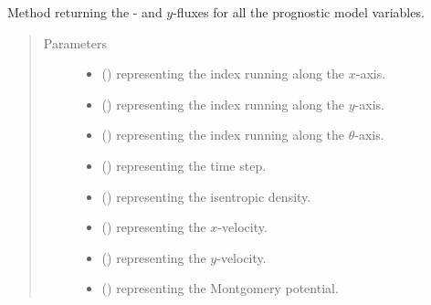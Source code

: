\documentclass[letterpaper,10pt,english]{sphinxmanual}
\begin{document}
\begin{fulllineitems}
\begin{fulllineitems}
\label{\detokenize{api:dycore.flux_isentropic_nonconservative.FluxIsentropicNonconservative.get_horizontal_fluxes}}
Method returning the - and \(y\)-fluxes
for all the prognostic model variables.
\begin{quote}\begin{description}
\item[{Parameters}] \leavevmode\begin{itemize}
\item {} 
 () \textendash{}  representing the index running along the \(x\)-axis.

\item {} 
 () \textendash{}  representing the index running along the \(y\)-axis.

\item {} 
 () \textendash{}  representing the index running along the \(\theta\)-axis.

\item {} 
 () \textendash{}  representing the time step.

\item {} 
 () \textendash{}  representing the isentropic density.

\item {} 
 () \textendash{}  representing the \(x\)-velocity.

\item {} 
 () \textendash{}  representing the \(y\)-velocity.

\item {} 
 () \textendash{}  representing the Montgomery potential.


\end{itemize}
\end{description}
\end{quote}
\end{fulllineitems}
\end{fulllineitems}
\end{document}

